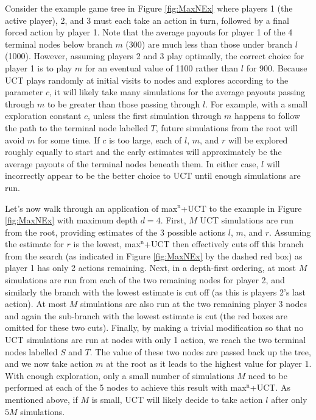 \documentclass[letterpaper]{article}
\numberwithin{equation}{section}
\numberwithin{theorem}{section}
\numberwithin{lemma}{section}
\numberwithin{df}{section}
\begin{document}
Consider the example game tree in Figure \ref{fig:MaxNEx} where players 1 (the active player), 2, and 3 must each take an action in turn, followed by a final forced action by player 1.  Note that the average payouts for player 1 of the 4 terminal nodes below branch $m$ (300) are much less than those under branch $l$ (1000).  However, assuming players 2 and 3 play optimally, the correct choice for player 1 is to play $m$ for an eventual value of 1100 rather than $l$ for 900.  Because UCT plays randomly at initial visits to nodes and explores according to the parameter $c$, it will likely take many simulations for the average payouts passing through $m$ to be greater than those passing through $l$.  For example, with a small exploration constant $c$, unless the first simulation through $m$ happens to follow the path to the terminal node labelled $T$, future simulations from the root will avoid $m$ for some time.  If $c$ is too large, each of $l$, $m$, and $r$ will be explored roughly equally to start and the early estimates will approximately be the average payouts of the terminal nodes beneath them. In either case, $l$ will incorrectly appear to be the better choice to UCT until enough simulations are run.  

Let's now walk through an application of max$^\text{n}$+UCT to the example in Figure \ref{fig:MaxNEx} with maximum depth $d = 4$.  First, $M$ UCT simulations are run from the root, providing estimates of the 3 possible actions $l$, $m$, and $r$.  Assuming the estimate for $r$ is the lowest, max$^\text{n}$+UCT then effectively cuts off this branch from the search (as indicated in Figure \ref{fig:MaxNEx} by the dashed red box) as player 1 has only 2 actions remaining.  Next, in a depth-first ordering, at most $M$ simulations are run from each of the two remaining nodes for player 2, and similarly the branch with the lowest estimate is cut off (as this is players 2's last action).  At most $M$ simulations are also run at the two remaining player 3 nodes and again the sub-branch with the lowest estimate is cut (the red boxes are omitted for these two cuts).  Finally, by making a trivial modification so that no UCT simulations are run at nodes with only 1 action, we reach the two terminal nodes labelled $S$ and $T$.  The value of these two nodes are passed back up the tree, and we now take action $m$ at the root as it leads to the highest value for player 1.  With enough exploration, only a small number of simulations $M$ need to be performed at each of the 5 nodes to achieve this result with max$^\text{n}$+UCT.  As mentioned above, if $M$ is small, UCT will likely decide to take action $l$ after only $5M$ simulations.
\end{document}
